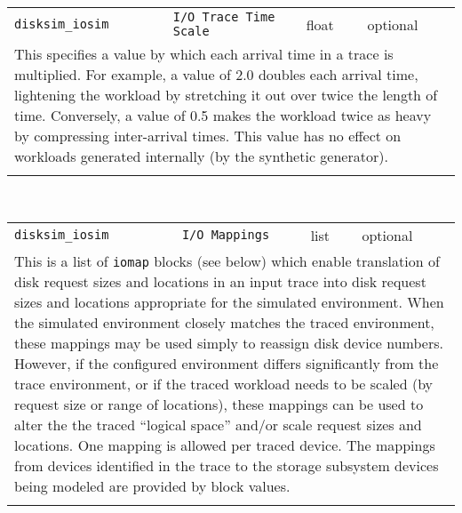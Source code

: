 \noindent 
\begin{tabular}{|p{\lpmodwidth}|p{\lpnamewidth}|p{0.5in}|p{0.5in}|}
\cline{1-4}
\texttt{disksim\_iosim} & \texttt{I/O Trace Time Scale} & float & optional \\ 
\cline{1-4}
\multicolumn{4}{|p{6in}|}{
This specifies a value by which each arrival time in a trace is
multiplied. For example, a value of 2.0 doubles each arrival time,
lightening the workload by stretching it out over twice the length of
time. Conversely, a value of 0.5 makes the workload twice as heavy by
compressing inter-arrival times. This value has no effect on
workloads generated internally (by the synthetic generator).
}\\ 
\cline{1-4}
\multicolumn{4}{p{5in}}{}\\
\end{tabular}\\ 
\noindent 
\begin{tabular}{|p{\lpmodwidth}|p{\lpnamewidth}|p{0.5in}|p{0.5in}|}
\cline{1-4}
\texttt{disksim\_iosim} & \texttt{I/O Mappings} & list & optional \\ 
\cline{1-4}
\multicolumn{4}{|p{6in}|}{
This is a list of \texttt{iomap} blocks (see below) which enable translation
of disk request sizes and locations in an input trace into disk
request sizes and locations appropriate for the simulated environment.
When the simulated environment closely matches the traced environment,
these mappings may be used simply to reassign disk device numbers.
However, if the configured environment differs significantly from the
trace environment, or if the traced workload needs to be scaled (by
request size or range of locations), these mappings can be used to
alter the the traced ``logical space'' and/or scale request sizes and
locations. One mapping is allowed per traced device.
The mappings from devices identified in the trace to the storage
subsystem devices being modeled are provided by block values.
}\\ 
\cline{1-4}
\multicolumn{4}{p{5in}}{}\\
\end{tabular}\\ 
